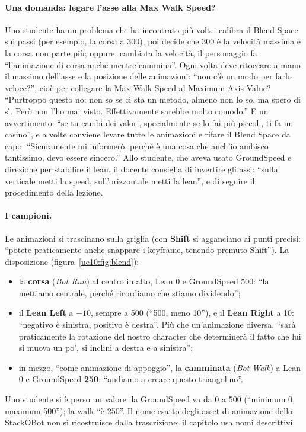 \paragraph{Una domanda: legare l'asse alla Max Walk Speed?} Uno studente ha un problema
che ha incontrato più volte: calibra il Blend Space sui passi (per esempio, la corsa a
300), poi decide che 300 è la velocità massima e la corsa non parte più; oppure, cambiata
la velocità, il personaggio fa ``l'animazione di corsa anche mentre cammina''. Ogni volta
deve ritoccare a mano il massimo dell'asse e la posizione delle animazioni: ``non c'è un
modo per farlo veloce?'', cioè per collegare la Max Walk Speed al Maximum Axis Value?
``Purtroppo questo no: non so se ci sta un metodo, almeno non lo so, ma spero di sì. Però
non l'ho mai visto. Effettivamente sarebbe molto comodo.'' E un avvertimento: ``se tu
cambi dei valori, specialmente se lo fai più piccoli, ti fa un casino'', e a volte
conviene levare tutte le animazioni e rifare il Blend Space da capo. ``Sicuramente mi
informerò, perché è una cosa che anch'io ambisco tantissimo, devo essere sincero.''
Allo studente, che aveva usato GroundSpeed e direzione per stabilire il lean, il docente
consiglia di invertire gli assi: ``sulla verticale metti la speed, sull'orizzontale metti
la lean'', e di seguire il procedimento della lezione.

\paragraph{I campioni.} Le animazioni si trascinano sulla griglia (con \textbf{Shift} si
agganciano ai punti precisi: ``potete praticamente anche snappare i keyframe, tenendo
premuto Shift''). La disposizione (figura~\ref{ue10:fig:blend}):
\begin{itemize}
  \item la \textbf{corsa} (\emph{Bot Run}) al centro in alto, Lean 0 e GroundSpeed 500:
        ``la mettiamo centrale, perché ricordiamo che stiamo dividendo'';
  \item il \textbf{Lean Left} a $-10$, sempre a 500 (``500, meno 10''), e il \textbf{Lean
        Right} a 10: ``negativo è sinistra, positivo è destra''. Più che un'animazione
        diversa, ``sarà praticamente la rotazione del nostro character che determinerà il
        fatto che lui si muova un po', si inclini a destra e a sinistra'';
  \item in mezzo, ``come animazione di appoggio'', la \textbf{camminata} (\emph{Bot
        Walk}) a Lean 0 e GroundSpeed \textbf{250}: ``andiamo a creare questo
        triangolino''.
\end{itemize}
Uno studente si è perso un valore: la GroundSpeed va da 0 a 500 (``minimum 0, maximum
500''); la walk ``è 250''. Il nome esatto degli asset di animazione dello StackOBot non si
ricostruisce dalla trascrizione; il capitolo usa nomi descrittivi.

